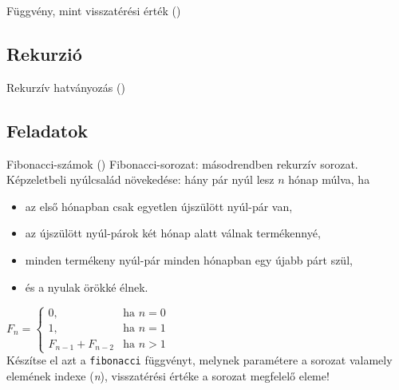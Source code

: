 \documentclass[usenames,dvipsnames,aspectratio=169]{beamer}
\begin{document}
\begin{frame}
    \begin{exampleblock}{Függvény, mint visszatérési érték ()}
        \small
        
    \end{exampleblock}
\end{frame}

\subsection{Rekurzió}

\begin{frame}
    \begin{exampleblock}{Rekurzív hatványozás ()}
        \small
        
    \end{exampleblock}
\end{frame}

\subsection{Feladatok}

\begin{frame}
    \begin{exampleblock}{Fibonacci-számok ()}
        Fibonacci-sorozat: másodrendben rekurzív sorozat. Képzeletbeli nyúlcsalád növekedése: hány pár nyúl lesz $n$ hónap múlva, ha
        \begin{itemize}
            \item az első hónapban csak egyetlen újszülött nyúl-pár van,
            \item az újszülött nyúl-párok két hónap alatt válnak termékennyé,
            \item minden termékeny nyúl-pár minden hónapban egy újabb párt szül,
            \item és a nyulak örökké élnek.
        \end{itemize}
        \vfill
        $F_n = \left\{ \begin{array}{ll}
            0, & \textrm{ha $n=0$}\\
            1, & \textrm{ha $n=1$}\\
            F_{n-1} + F_{n-2} & \textrm{ha $n>1$}
        \end{array} \right.$ \\
        Készítse el azt a \texttt{fibonacci} függvényt, melynek paramétere a sorozat valamely elemének indexe (\emph{n}), visszatérési értéke a sorozat megfelelő eleme!
    \end{exampleblock}
\end{frame}
\end{document}
